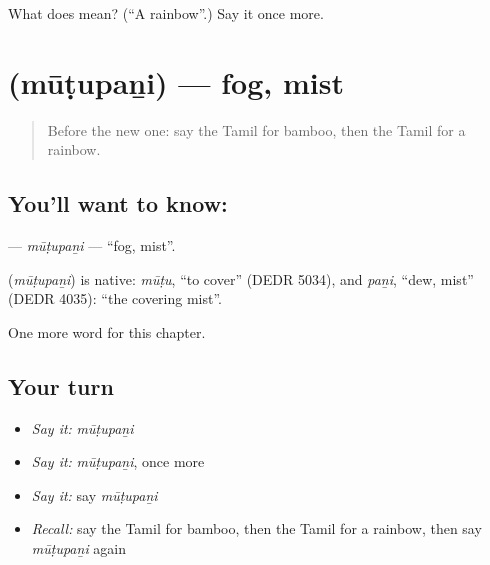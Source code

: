 \begin{tcolorbox}[breakable,colback=teal!4,colframe=teal!35!black,title={Before you move on}]
What does  mean? (\textquotedblleft{}A rainbow\textquotedblright{}.) Say it once more.
\end{tcolorbox}
\section[\texorpdfstring{\ta{மூடுபனி} (mūṭupaṉi)}{மூடுபனி (mūṭupaṉi)}]{ (mūṭupaṉi) — fog, mist}

\label{lesson:TA-C219-mutupani}



\begin{quote}
Before the new one: say the Tamil for bamboo, then the Tamil for a rainbow.
\end{quote}

\subsection*{You'll want to know: }
\textbf{} — \emph{mūṭupaṉi} — \textquotedblleft{}fog, mist\textquotedblright{}.

\begin{cousinweb}
\textbf{} (\emph{mūṭupaṉi}) is native: \emph{mūṭu}, \textquotedblleft{}to cover\textquotedblright{} (DEDR 5034), and \emph{paṉi}, \textquotedblleft{}dew, mist\textquotedblright{} (DEDR 4035): \textquotedblleft{}the covering mist\textquotedblright{}.
\end{cousinweb}

\begin{grammarlens}[title={What you've built}]
One more word for this chapter.
\end{grammarlens}

\subsection*{Your turn}
\begin{itemize}
\raggedright
  \item \emph{Say it:} \emph{mūṭupaṉi}
  \item \emph{Say it:} \emph{mūṭupaṉi}, once more
  \item \emph{Say it:} say \emph{mūṭupaṉi}
  \item \emph{Recall:} say the Tamil for bamboo, then the Tamil for a rainbow, then say \emph{mūṭupaṉi} again
\end{itemize}

